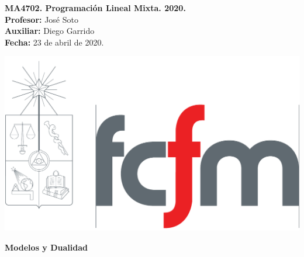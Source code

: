 \documentclass[10pt]{article}
\theoremstyle{plain}
\theoremstyle{definition}
\newcommand{\sca}{Diego Garrido}
\newcommand{\fecha}{23 de  abril  de 2020}
\begin{document}
\vspace*{-1.2 cm}
\begin{minipage}{0.6\textwidth}
\begin{flushleft}
\hspace*{-0.5cm}\textbf{MA4702. Programación Lineal Mixta. 2020.}\\
\hspace*{-0.5cm}\textbf{Profesor:} José Soto\\
\hspace*{-0.5cm}\textbf{Auxiliar:} \sca\\
\hspace*{-0.5cm}\textbf{Fecha:} \fecha.
\end{flushleft}
\end{minipage}
\begin{minipage}{0.36\textwidth}
\begin{flushright}
\includegraphics[scale=0.15]{fcfm}
\end{flushright}
\end{minipage}
\bigskip

\begin{center}
\LARGE\textbf{Modelos y Dualidad}
\end{center}
\end{document}
